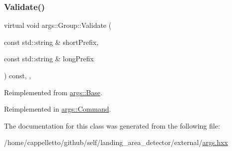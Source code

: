 \mbox{\label{classargs_1_1_group_a9f74bb3d58e5bfe331a6af8a9981ebda}} 
\subsubsection{\texorpdfstring{Validate()}{Validate()}}
{\footnotesize\ttfamily virtual void args\+::\+Group\+::\+Validate (\begin{DoxyParamCaption}\item[{const std\+::string \&}]{short\+Prefix,  }\item[{const std\+::string \&}]{long\+Prefix }\end{DoxyParamCaption}) const\hspace{0.3cm}{\ttfamily [inline]}, {\ttfamily [override]}, {\ttfamily [virtual]}}



Reimplemented from \hyperlink{classargs_1_1_base_a62ea917978306062785cbfaa4dd51d2f}{args\+::\+Base}.



Reimplemented in \hyperlink{classargs_1_1_command_ad39b397a91af426f0ecbda9d29d7bbe0}{args\+::\+Command}.



The documentation for this class was generated from the following file\+:\begin{DoxyCompactItemize}
\item 
/home/cappelletto/github/self/landing\+\_\+area\+\_\+detector/external/\hyperlink{args_8hxx}{args.\+hxx}\end{DoxyCompactItemize}
